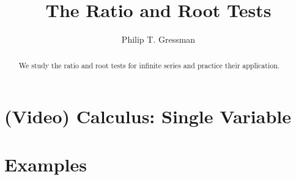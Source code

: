 \documentclass{ximera}
\title{The Ratio and Root Tests}
\author{Philip T. Gressman}
\begin{document}
\begin{abstract}
We study the ratio and root tests for infinite series and practice their application.
\end{abstract}
\maketitle

\section*{(Video) Calculus: Single Variable}

\section*{Examples}

\begin{example}

\end{example}

\begin{example}

\end{example}
\end{document}
